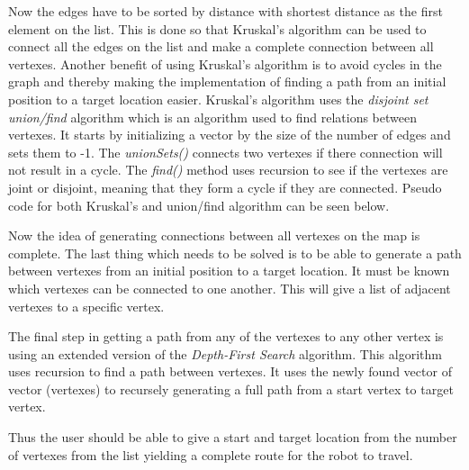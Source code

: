 \documentclass[../Head/Main.tex]{subfiles}
\begin{document}


Now the edges have to be sorted by distance with shortest distance as the first element on the list. This is done so that Kruskal's algorithm can be used to connect all the edges on the list and make a complete connection between all vertexes. Another benefit of using Kruskal's algorithm is to avoid cycles in the graph and thereby making the implementation of finding a path from an initial position to a target location easier. Kruskal's algorithm uses the \textit{disjoint set union/find} algorithm which is an algorithm used to find relations between vertexes. It starts by initializing a vector by the size of the number of edges and sets them to -1. The \textit{unionSets()} connects two vertexes if there connection will not result in a cycle.  The \textit{find()} method uses recursion to see if the vertexes are joint or disjoint, meaning that they form a cycle if they are connected. Pseudo code for both Kruskal's and union/find algorithm can be seen below.     



Now the idea of generating connections between all vertexes on the map is complete. The last thing which needs to be solved is to be able to generate a path between vertexes from an initial position to a target location. It must be known which vertexes can be connected to one another. This will give a list of adjacent vertexes to a specific vertex. 

The final step in getting a path from any of the vertexes to any other vertex is using an extended version of the \textit{Depth-First Search} algorithm. This algorithm uses recursion to find a path between vertexes. It uses the newly found vector of vector (vertexes) to recursely generating a full path from a start vertex to target vertex. 

Thus the user should be able to give a start and target location from the number of vertexes from the list yielding a complete route for the robot to travel.
\end{document}
